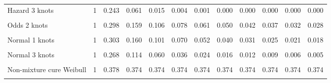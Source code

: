 \documentclass[
]{article}
\begin{document}
\begin{table}[H]
{\begin{tabular}[t]{lrrrrrrrrrrr}
Hazard 3 knots & 1 & 0.243 & 0.061 & 0.015 & 0.004 & 0.001 & 0.000 & 0.000 & 0.000 & 0.000 & 0.000\\
\cellcolor{gray!10}{Odds 1 knots} & \cellcolor{gray!10}{1} & \cellcolor{gray!10}{0.320} & \cellcolor{gray!10}{0.190} & \cellcolor{gray!10}{0.135} & \cellcolor{gray!10}{0.104} & \cellcolor{gray!10}{0.085} & \cellcolor{gray!10}{0.072} & \cellcolor{gray!10}{0.062} & \cellcolor{gray!10}{0.055} & \cellcolor{gray!10}{0.049} & \cellcolor{gray!10}{0.044}\\
Odds 2 knots & 1 & 0.298 & 0.159 & 0.106 & 0.078 & 0.061 & 0.050 & 0.042 & 0.037 & 0.032 & 0.028\\
\cellcolor{gray!10}{Odds 3 knots} & \cellcolor{gray!10}{1} & \cellcolor{gray!10}{0.272} & \cellcolor{gray!10}{0.127} & \cellcolor{gray!10}{0.078} & \cellcolor{gray!10}{0.054} & \cellcolor{gray!10}{0.040} & \cellcolor{gray!10}{0.032} & \cellcolor{gray!10}{0.026} & \cellcolor{gray!10}{0.022} & \cellcolor{gray!10}{0.019} & \cellcolor{gray!10}{0.016}\\
Normal 1 knots & 1 & 0.303 & 0.160 & 0.101 & 0.070 & 0.052 & 0.040 & 0.031 & 0.025 & 0.021 & 0.018\\
\cellcolor{gray!10}{Normal 2 knots} & \cellcolor{gray!10}{1} & \cellcolor{gray!10}{0.299} & \cellcolor{gray!10}{0.154} & \cellcolor{gray!10}{0.096} & \cellcolor{gray!10}{0.065} & \cellcolor{gray!10}{0.047} & \cellcolor{gray!10}{0.036} & \cellcolor{gray!10}{0.028} & \cellcolor{gray!10}{0.023} & \cellcolor{gray!10}{0.018} & \cellcolor{gray!10}{0.015}\\
Normal 3 knots & 1 & 0.268 & 0.114 & 0.060 & 0.036 & 0.024 & 0.016 & 0.012 & 0.009 & 0.006 & 0.005\\
\cellcolor{gray!10}{Mixture cure Weibull} & \cellcolor{gray!10}{1} & \cellcolor{gray!10}{0.386} & \cellcolor{gray!10}{0.384} & \cellcolor{gray!10}{0.384} & \cellcolor{gray!10}{0.384} & \cellcolor{gray!10}{0.384} & \cellcolor{gray!10}{0.384} & \cellcolor{gray!10}{0.384} & \cellcolor{gray!10}{0.384} & \cellcolor{gray!10}{0.384} & \cellcolor{gray!10}{0.384}\\
Non-mixture cure Weibull & 1 & 0.378 & 0.374 & 0.374 & 0.374 & 0.374 & 0.374 & 0.374 & 0.374 & 0.374 & 0.374\\
\cellcolor{gray!10}{Mixture cure Log-normal} & \cellcolor{gray!10}{1} & \cellcolor{gray!10}{0.343} & \cellcolor{gray!10}{0.290} & \cellcolor{gray!10}{0.281} & \cellcolor{gray!10}{0.279} & \cellcolor{gray!10}{0.278} & \cellcolor{gray!10}{0.278} & \cellcolor{gray!10}{0.278} & \cellcolor{gray!10}{0.278} & \cellcolor{gray!10}{0.278} & \cellcolor{gray!10}{0.277}\\

\end{tabular}}
\end{table}
\end{document}
